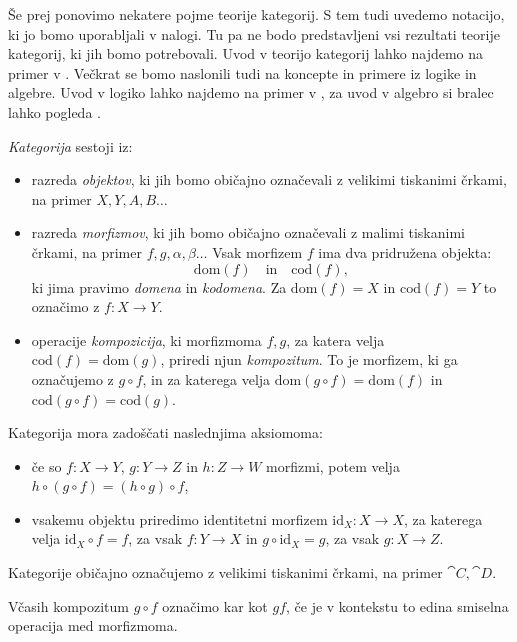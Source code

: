 \documentclass[../kategoricna_logika.tex]{subfiles}
\begin{document}
Še prej ponovimo nekatere pojme teorije kategorij.
S tem tudi uvedemo notacijo, ki jo bomo uporabljali v nalogi.
Tu pa ne bodo predstavljeni vsi rezultati teorije kategorij, ki jih bomo potrebovali.
Uvod v teorijo kategorij lahko najdemo na primer v
\cite{awodey2010category, riehl2017category, taslak2017}.
Večkrat se bomo naslonili tudi na koncepte in primere iz logike in algebre.
Uvod v logiko lahko najdemo na primer v \cite{prijatelj1992osnove1},
za uvod v algebro si bralec lahko pogleda \cite{bresar2018uvod}.
\begin{definicija}
  \emph{Kategorija} sestoji iz:
  \begin{itemize}
  \item razreda \emph{objektov}, ki jih bomo običajno označevali z
    velikimi tiskanimi črkami, na primer $X, Y, A, B \ldots$
  \item razreda \emph{morfizmov}, ki jih bomo običajno označevali z
    malimi tiskanimi črkami, na primer $f,g,\alpha,\beta \ldots$
    Vsak morfizem $f$ ima dva pridružena objekta:
    \[ \mathrm{dom}(f) \quad \text{in} \quad \mathrm{cod}(f), \]
    ki jima pravimo \emph{domena} in \emph{kodomena}. Za $\mathrm{dom}(f)=X$
    in ${\mathrm{cod}(f)=Y}$ to označimo z $f : X \to Y$.
  \item operacije \emph{kompozicija}, ki morfizmoma $f,g$,
    za katera velja $\mathrm{cod}(f) = \mathrm{dom}(g)$,
    priredi njun \emph{kompozitum}. To je morfizem, ki ga označujemo z $g \circ f$, in
    za katerega velja $\mathrm{dom}(g \circ f) = \mathrm{dom}(f)$ in
    $\mathrm{cod}(g \circ f) = \mathrm{cod}(g)$. 
  \end{itemize}
Kategorija mora zadoščati naslednjima aksiomoma:
  \begin{itemize}
  \item če so \( f: X \to Y\), \(g : Y \to Z\) in \(h : Z \to W\) morfizmi, potem
    velja \(h \circ (g \circ f) = (h \circ g) \circ f\),
  \item vsakemu objektu priredimo identitetni morfizem
    $\mathrm{id}_X : X \to X$, za katerega velja $\mathrm{id}_X \circ f = f$,
    za vsak $f : Y \to X$ in $g \circ \mathrm{id}_X = g$, za vsak $g : X \to Z$.
\end{itemize}
Kategorije običajno označujemo z velikimi tiskanimi črkami, na primer $\cat{C}, \cat{D}$.
\end{definicija}
\begin{opomba}
  Včasih kompozitum $g \circ f$ označimo kar kot $g f$, če je v kontekstu to edina
  smiselna operacija med morfizmoma.
\end{opomba}
\end{document}
